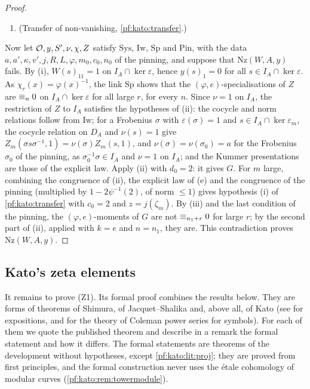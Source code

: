 \begin{proof}
\begin{enumerate}[label=(\roman*)]
\item (Transfer of non-vanishing, \cref{pf:kato:transfer}.)
\end{enumerate}
Now let $\mathcal{O},y,S',\nu,\chi,Z$ satisfy $\mathrm{Sys}$, $\mathrm{Iw}$, $\mathrm{Sp}$ and $\mathrm{Pin}$, with the data $a,a',\kappa,v',j,R,L,
\varphi,m_0,c_0,n_0$ of the pinning, and suppose that $\mathrm{Nz}(W,A,y)$ fails. By (i), $W(s)_{11}=1$ on $I_A\cap\ker\varepsilon$, hence
$y(s)_1=0$ for all $s\in I_A\cap\ker\varepsilon$. As $\chi_r(x)=\varphi(x)^{-1}$, the link $\mathrm{Sp}$ shows that the
$(\varphi,e)$-specialisations of $Z$ are $\equiv_{n}0$ on $I_A\cap\ker\varepsilon$ for all large $r$, for every $n$. Since $\nu=1$ on $I_A$,
the restriction of $Z$ to $I_A$ satisfies the hypotheses of (ii): the cocycle and norm relations follow from $\mathrm{Iw}$; for a
Frobenius $\sigma$ with $\varepsilon(\sigma)=1$ and $s\in I_A\cap\ker\varepsilon_m$, the cocycle relation on $D_A$ and $\nu(s)=1$ give
$Z_m(\sigma s\sigma^{-1},1)=\nu(\sigma)Z_m(s,1)$, and $\nu(\sigma)=\nu(\sigma_0)=a$ for the Frobenius $\sigma_0$ of the pinning, as
$\sigma_0^{-1}\sigma\in I_A$ and $\nu=1$ on $I_A$; and the Kummer presentations are those of the explicit law. Apply (ii) with
$d_0=2$: it gives $G$. For $m$ large, combining the congruence of (ii), the explicit law of (e) and the congruence of the
pinning (multiplied by $1-2\psi^{-1}(2)$, of norm $\le1$) gives hypothesis (i) of \cref{pf:kato:transfer} with $c_0=2$ and $z=j(\zeta_m)$. By (iii)
and the last condition of the pinning, the $(\varphi,e)$-moments of $G$ are not $\equiv_{n_1+r}0$ for large $r$; by the second
part of (ii), applied with $k=e$ and $n=n_1$, they are. This contradiction proves $\mathrm{Nz}(W,A,y)$.
\end{proof}

\subsection{Kato's zeta elements}\label{pf:kato:sec:katozeta}

It remains to prove \textup{(Z1)}. Its formal proof combines the results below. They are forms of theorems of Shimura, of
Jacquet--Shalika and, above all, of Kato \cite{Kato2004} (see \cite{Scholl1998,Colmez2004} for expositions, and \cite{Fukaya2003} for
the theory of Coleman power series for symbols). For each of them we quote the published theorem and describe in a remark the formal
statement and how it differs. The formal statements are theorems of the development without hypotheses, except
\cref{pf:kato:lit:proj}; they are proved from first principles, and the formal construction never uses the \'etale cohomology of modular
curves (\cref{pf:kato:rem:towermodule}).

